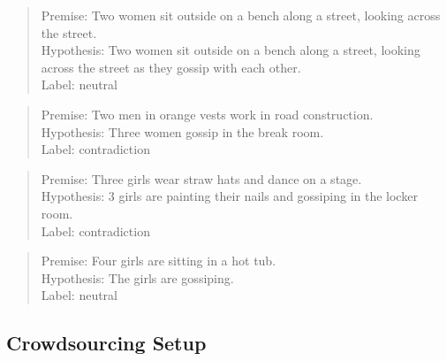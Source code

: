 \documentclass[11pt]{article}
\begin{document}
    \begin{quote}
        Premise: Two women sit outside on a bench along a street, looking across the street. \\
        Hypothesis: Two women sit outside on a bench along a street, looking across the street as they gossip with each other. \\
        Label: neutral
    \end{quote}

    \begin{quote}
        Premise: Two men in orange vests work in road construction. \\
        Hypothesis: Three women gossip in the break room. \\
        Label: contradiction
    \end{quote}

    \begin{quote}
        Premise: Three girls wear straw hats and dance on a stage. \\
        Hypothesis: 3 girls are painting their nails and gossiping in the locker room. \\
        Label: contradiction \\
    \end{quote}

    \begin{quote}
        Premise: Four girls are sitting in a hot tub. \\
        Hypothesis: The girls are gossiping. \\
        Label: neutral
    \end{quote}

    \subsection{Crowdsourcing Setup}

    \clearpage
    
    



\end{document}
